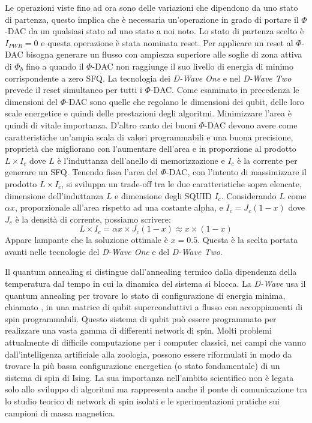 \cite{ACI}Le operazioni viste fino ad ora sono delle variazioni che dipendono da uno stato di partenza, questo implica che è necessaria un'operazione in grado di portare il $\Phi$-DAC da un qualsiasi stato ad uno stato a noi noto. Lo stato di partenza scelto è $I_{PWR} = 0$ e questa operazione è stata nominata reset. Per applicare un reset al $\Phi$-DAC bisogna generare un flusso con ampiezza superiore alle soglie di zona attiva di $\Phi_b$ fino a quando il $\Phi$-DAC non raggiunge il suo livello di energia di minimo corrispondente a zero SFQ. La tecnologia dei \textit{D-Wave One} e nel \textit{D-Wave Two} prevede il reset simultaneo per tutti i $\Phi$-DAC.
Come esaminato in precedenza le dimensioni del $\Phi$-DAC sono quelle che regolano le dimensioni dei qubit, delle loro scale energetice e quindi delle prestazioni degli algoritmi. Minimizzare l'area è quindi di vitale importanza. D'altro canto dei buoni $\Phi$-DAC devono avere come caratteristiche un'ampia scala di valori programmabili e una buona precisione, proprietà che migliorano con l'aumentare dell'area e in proporzione al prodotto $L \times I_c$ dove $L$ è l'induttanza dell'anello di memorizzazione e $I_c$ è la corrente per generare un SFQ. Tenendo fissa l'area del $\Phi$-DAC, con l'intento di massimizzare il prodotto $L \times I_c$, si sviluppa un trade-off tra le due caratteristiche sopra elencate, dimensione dell'induttanza $L$ e dimensione degli SQUID $I_c$. Considerando $L$ come $\alpha x$, proporzionale all'area rispetto ad una costante alpha, e $I_c = J_c (1-x)$ dove $J_c$ è la densità di corrente, possiamo scrivere:
$$ L \times I_c = \alpha x \times J_c (1-x) \approx x \times (1 - x)$$
Appare lampante che la soluzione ottimale è $x = 0.5$. Questa è la scelta portata avanti nelle tecnologie del \textit{D-Wave One} e del \textit{D-Wave Two}.

\cite{QAS}Il quantum annealing si distingue dall'annealing termico dalla dipendenza della temperatura dal tempo in cui la dinamica del sistema si blocca. La \textit{D-Wave} usa il quantum annealing per trovare lo stato di configurazione di energia minima, chiamato , in una matrice di qubit superconduttivi a flusso con accoppiamenti di spin programmabili. Questo sistema di qubit può essere programmato per realizzare una vasta gamma di differenti network di spin. Molti problemi attualmente di difficile computazione per i computer classici, nei campi che vanno dall'intelligenza artificiale alla zoologia, possono essere riformulati in modo da trovare la più bassa configurazione energetica (o stato fondamentale) di un sistema di spin di Ising. La sua importanza nell'ambito scientifico non è legata solo allo sviluppo di algoritmi ma rappresenta anche il ponte di comunicazione tra lo studio teorico di network di spin isolati e le sperimentazioni pratiche sui campioni di massa magnetica.

